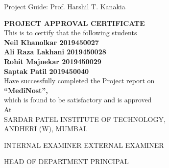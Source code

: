 \documentclass{article}
\begin{document}
\bigskip \bigskip
\begin{flushleft}

\large Project Guide: Prof. Harshil T. Kanakia
\end{flushleft}
\clearpage
\begin{center}
    \thispagestyle{empty}
    \textbf{\Large PROJECT APPROVAL CERTIFICATE\\}
    \bigskip \bigskip
    \large This is to certify that the following students\\
    \bigskip \bigskip \bigskip
    \textbf{
      Neil Khanolkar 2019450027\\ 
      Ali Raza Lakhani 2019450028 \\
      Rohit Majnekar 2019450029 \\ 
      Saptak Patil 2019450040 \\
    }
    \bigskip \bigskip \bigskip
    \large Have successfully completed the Project report on \\ 
    \textbf{\Large“MediNost”,}\\
    \large which is found to be satisfactory and is approved\\
    \bigskip \bigskip \bigskip 
    \large At \\
    \bigskip 
    SARDAR PATEL INSTITUTE OF TECHNOLOGY,\\
    ANDHERI (W), MUMBAI.\\
\end{center}
\bigskip \bigskip \bigskip \bigskip \bigskip
\bigskip 
\begin{flushleft}
    INTERNAL EXAMINER
    \hfill
    EXTERNAL EXAMINER
\end{flushleft}
\bigskip \bigskip \bigskip \bigskip \bigskip
\bigskip 
\begin{flushleft}
    HEAD OF DEPARTMENT
    \hfill
    PRINCIPAL
\end{flushleft}
\clearpage
\end{document}
